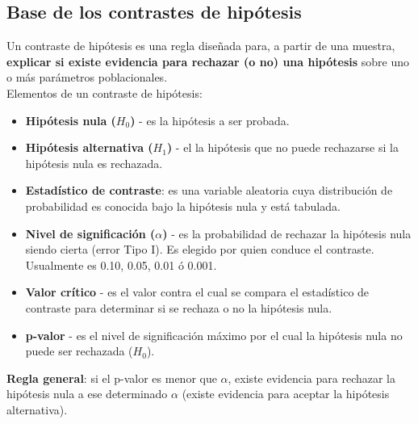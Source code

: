\documentclass[10pt, a4paper, landscape]{extarticle}
\begin{document}
\begin{multicols}{3}
	\subsection*{Base de los contrastes de hipótesis}
		Un contraste de hipótesis es una regla diseñada para, a partir de una muestra, \textbf{explicar si existe evidencia para rechazar (o no) una hipótesis} sobre uno o más parámetros poblacionales.
		\\ Elementos de un contraste de hipótesis:
		\begin{itemize}[leftmargin=*]
			\item \textbf{Hipótesis nula ($H_0$)} - es la hipótesis a ser probada.
			\item \textbf{Hipótesis alternativa ($H_1$)} - el la hipótesis que no puede rechazarse si la hipótesis nula es rechazada.
			\item \textbf{Estadístico de contraste}: es una variable aleatoria cuya distribución de probabilidad es conocida bajo la hipótesis nula y está tabulada.
			\item \textbf{Nivel de significación ($\alpha$)} - es la probabilidad de rechazar la hipótesis nula siendo cierta (error Tipo I). Es elegido por quien conduce el contraste. Usualmente es 0.10, 0.05, 0.01 ó 0.001.
			\item \textbf{Valor crítico} - es el valor contra el cual se compara el estadístico de contraste para determinar si se rechaza o no la hipótesis nula.
			\item \textbf{p-valor} - es el nivel de significación máximo por el cual la hipótesis nula no puede ser rechazada ($H_0$).
		\end{itemize}
		\textbf{Regla general}: si el p-valor es menor que $\alpha$, existe evidencia para rechazar la hipótesis nula a ese determinado $\alpha$ (existe evidencia para aceptar la hipótesis alternativa).

\end{multicols}
\end{document}
